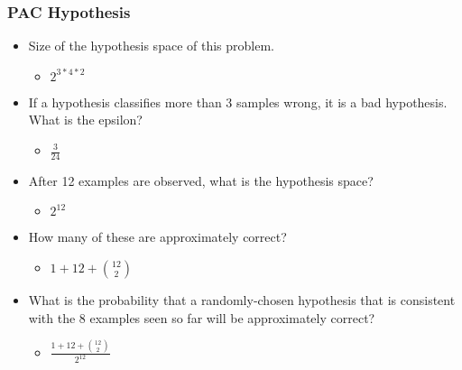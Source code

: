 \documentclass[compress, 9pt]{beamer}
\begin{document}
\begin{frame}
\frametitle{PAC Hypothesis}
\label{sec-4-1}
\begin{itemize}

\item <2-> Size of the hypothesis space of this problem.
\label{sec-4-1-1}%
\begin{itemize}

\item <3-> $2^{3*4*2}$
\label{sec-4-1-1-1}%
\end{itemize} %

\item <4-> If a hypothesis classifies more than 3 samples wrong, it is a bad hypothesis. What is the epsilon?
\label{sec-4-1-2}%
\begin{itemize}

\item <5-> $\frac{3}{24}$
\label{sec-4-1-2-1}%
\end{itemize} %

\item <6-> After 12 examples are observed, what is the hypothesis space?
\label{sec-4-1-3}%
\begin{itemize}

\item <7-> $2^{12}$
\label{sec-4-1-3-1}%
\end{itemize} %

\item <8-> How many of these are approximately correct?
\label{sec-4-1-4}%
\begin{itemize}

\item <9-> $1 + 12 + {12\choose2}$
\label{sec-4-1-4-1}%
\end{itemize} %

\item <10-> What is the probability that a randomly-chosen hypothesis that is consistent with the 8 examples seen so far will be approximately correct?
\label{sec-4-1-5}%
\begin{itemize}

\item <11-> $\frac{1 + 12 + {12\choose2}} {2^{12}}$\\
\label{sec-4-1-5-1}%
\end{itemize} %
\end{itemize} %
\end{frame}
\end{document}

